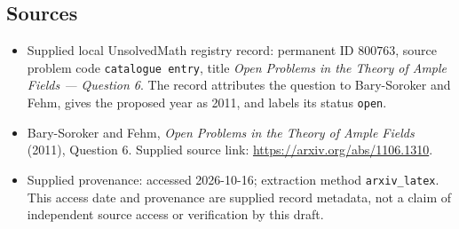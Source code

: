 \documentclass[11pt]{article}
\begin{document}
\subsection{Sources}
\begin{itemize}
\item Supplied local UnsolvedMath registry record: permanent ID \(800763\), source problem code \texttt{catalogue entry}, title \emph{Open Problems in the Theory of Ample Fields --- Question 6}. The record attributes the question to Bary-Soroker and Fehm, gives the proposed year as 2011, and labels its status \texttt{open}.
\item Bary-Soroker and Fehm, \emph{Open Problems in the Theory of Ample Fields} (2011), Question 6. Supplied source link: \url{https://arxiv.org/abs/1106.1310}.
\item Supplied provenance: accessed 2026-10-16; extraction method \texttt{arxiv\_latex}. This access date and provenance are supplied record metadata, not a claim of independent source access or verification by this draft.
\end{itemize}
\end{document}
